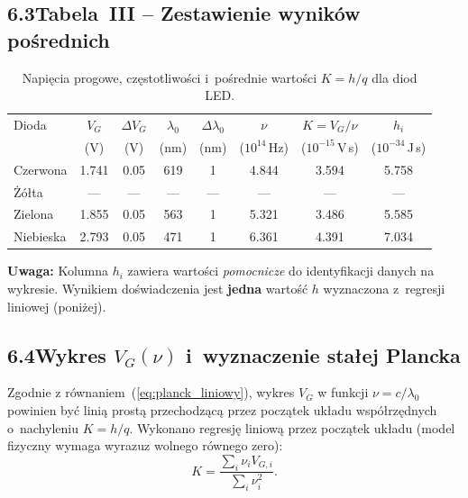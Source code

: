 \documentclass[a4paper,12pt]{article}
\begin{document}
\subsection*{6.3\quad Tabela~III – Zestawienie wyników pośrednich}

\begin{table}[H]
\centering
\caption{Napięcia progowe, częstotliwości i~pośrednie wartości $K = h/q$
         dla diod LED.}
\label{tab:III}
\renewcommand{\arraystretch}{1.25}
\setlength{\tabcolsep}{5pt}
\begin{tabular}{lS[table-format=1.3]S[table-format=1.2]S[table-format=3.0]S[table-format=1.0]
               S[table-format=1.3]S[table-format=1.3]S[table-format=1.3]}
\toprule
Dioda &
  {$V_G$} & {$\Delta V_G$} &
  {$\lambda_0$} & {$\Delta\lambda_0$} &
  {$\nu$} &
  {$K\!=\!V_G/\nu$} &
  {$h_i$} \\
  & {(V)} & {(V)} & {(nm)} & {(nm)} & {($10^{14}$\,Hz)}
  & {($10^{-15}$\,V\,s)} & {($10^{-34}$\,J\,s)} \\
\midrule
Czerwona & 1.741 & 0.05 & 619 & 1 & 4.844 & 3.594 & 5.758 \\
Żółta    & {---} & {---}& {---}& {---}& {---} & {---} & {---} \\
Zielona  & 1.855 & 0.05 & 563 & 1 & 5.321 & 3.486 & 5.585 \\
Niebieska& 2.793 & 0.05 & 471 & 1 & 6.361 & 4.391 & 7.034 \\
\bottomrule
\end{tabular}
\end{table}

\noindent\textbf{Uwaga:} Kolumna $h_i$ zawiera wartości \emph{pomocnicze} do identyfikacji
danych na wykresie. Wynikiem doświadczenia jest \textbf{jedna} wartość $h$ wyznaczona
z~regresji liniowej (poniżej).

\subsection*{6.4\quad Wykres $V_G(\nu)$ i~wyznaczenie stałej Plancka}

Zgodnie z równaniem~(\ref{eq:planck_liniowy}), wykres $V_G$ w funkcji $\nu = c/\lambda_0$
powinien być linią prostą przechodzącą przez początek układu współrzędnych
o~nachyleniu $K = h/q$. Wykonano regresję liniową przez początek układu (model fizyczny
wymaga wyrazuz wolnego równego zero):
\begin{equation}
  K = \frac{\sum_i \nu_i V_{G,i}}{\sum_i \nu_i^2}.
\end{equation}
\end{document}

